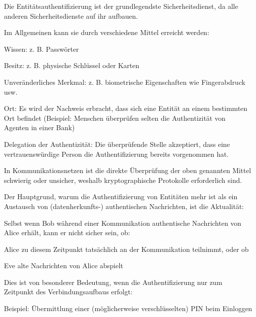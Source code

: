 \documentclass[a4paper]{article}
\begin{document}
\begin{multicols}{3}
      \begin{itemize*}
            \item Die Entitätsauthentifizierung ist der grundlegendste
            Sicherheitsdienst, da alle anderen Sicherheitsdienste auf ihr
            aufbauen.
            \item Im Allgemeinen kann sie durch verschiedene Mittel erreicht werden:
            \begin{itemize*}
                  \item Wissen: z. B. Passwörter
                  \item Besitz: z. B. physische Schlüssel oder Karten
                  \item Unveränderliches Merkmal: z. B. biometrische Eigenschaften wie Fingerabdruck usw.
                  \item Ort: Es wird der Nachweis erbracht, dass sich eine Entität an einem bestimmten Ort befindet (Beispiel: Menschen überprüfen selten die Authentizität von Agenten in einer Bank)
                  \item Delegation der Authentizität: Die überprüfende Stelle akzeptiert, dass eine vertrauenswürdige Person die Authentifizierung bereits vorgenommen hat.
            \end{itemize*}
            \item In Kommunikationsnetzen ist die direkte Überprüfung der oben genannten
            Mittel schwierig oder unsicher, weshalb kryptographische Protokolle
            erforderlich sind.
            \item Der Hauptgrund, warum die Authentifizierung von Entitäten mehr ist als
            ein Austausch von (datenherkunfts-) authentischen Nachrichten, ist die
            Aktualität:
            \begin{itemize*}
                  \item Selbst wenn Bob während einer Kommunikation authentische Nachrichten von Alice erhält, kann er nicht sicher sein, ob:
                  \begin{itemize*} \item Alice zu diesem Zeitpunkt tatsächlich an der Kommunikation teilnimmt, oder ob \item Eve alte Nachrichten von Alice abspielt \end{itemize*}
                  \item Dies ist von besonderer Bedeutung, wenn die Authentifizierung nur zum Zeitpunkt des Verbindungsaufbaus erfolgt:
                  \begin{itemize*} \item Beispiel: Übermittlung einer (möglicherweise verschlüsselten) PIN beim Einloggen \end{itemize*}

\end{itemize*}
\end{itemize*}
\end{multicols}
\end{document}
